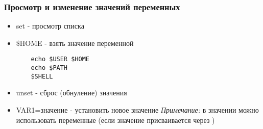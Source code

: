 \begin{frame}[fragile]
  \frametitle{Просмотр и изменение значений переменных}
  \normalsize{ }
  \begin{itemize}
    \item \alert{set} - просмотр списка \pause
    \item \alert{\$HOME} - взять значение переменной \pause
\begin{lstlisting}
	echo $USER $HOME
	echo $PATH 
	$SHELL
\end{lstlisting} \pause 
    \item \alert{unset} - сброс (обнуление) значения \pause
    \item \alert{VAR1=\textquotedbl значение \textquotedbl} - установить новое значение \newline 
      \emph{Примечание:} в значении можно использовать переменные (если значение присваивается через \textquotedbl \textquotedbl )
  \end{itemize}

\end{frame}
